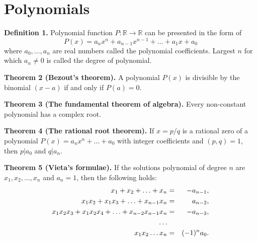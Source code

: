 \documentclass{article}
\begin{document}
\section{Polynomials}

\textbf{Definition 1.}  Polynomial function $P \colon \mathbb{R} \to \mathbb{R}$ can be presented in the form of
$$P(x)=a_nx^n+a_{n-1}x^{n-1}+\dots+a_1x+a_0$$
where $a_0,\dots,a_n$ are real numbers called the polynomial coefficients. Largest $n$ for which $a_n\ne 0$ is called the degree of polynomial.


\textbf{Theorem 2 (Bezout's theorem).}
A polynomial $P(x)$ is divisible by the binomial $(x-a)$ if and only if $P(a)=0$.

\textbf{Theorem 3 (The fundamental theorem of algebra).}
Every non-constant polynomial has a complex root.

\textbf{Theorem 4 (The rational root theorem).} If $x = p/q$ is a rational zero
of a polynomial $P(x) = a_nx^n +\hdots +a_0$ with integer coefficients and $(p, q)=1$,
then $p | a_0$ and $q | a_n$.

\textbf{Theorem 5 (Vieta's formulae).} If the solutions polynomial of degree $n$ are $x_1,x_2,\dots,x_n$ and  $a_n=1$, then the following holds:
\begin{eqnarray*}
x_1+x_2+\ldots+x_n &=& -a_{n-1},\\
x_1x_2+x_1x_3+\ldots+x_{n-1}x_{n} &=& \hphantom{-} a_{n-2}, \\
x_1x_2x_3+x_1x_2x_4+\ldots+x_{n-2}x_{n-1}x_n &=& -a_{n-3},\\
\ldots \\
x_1x_2\ldots x_n &=& (-1)^n a_0.
\end{eqnarray*}
\end{document}
